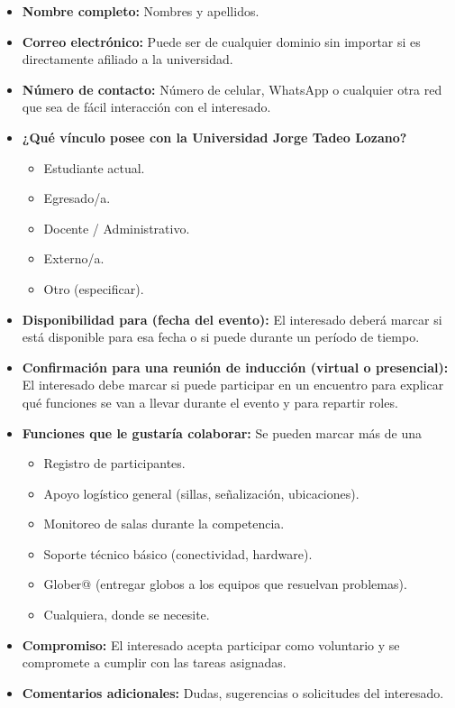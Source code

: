 \documentclass{article}
\begin{document}
\begin{itemize}
  \item \textbf{Nombre completo:} Nombres y apellidos.
  \item \textbf{Correo electrónico:} Puede ser de cualquier dominio sin importar si es directamente afiliado a la universidad.
  \item \textbf{Número de contacto:} Número de celular, WhatsApp o cualquier otra red que sea de fácil interacción con el interesado.
  \item \textbf{¿Qué vínculo posee con la Universidad Jorge Tadeo Lozano?}
        \begin{itemize}[label=$\square$]
          \item  Estudiante actual.
          \item  Egresado/a.
          \item  Docente / Administrativo.
          \item  Externo/a.
          \item  Otro (especificar).
        \end{itemize}
  \item \textbf{Disponibilidad para (fecha del evento):} El interesado deberá marcar si está disponible para esa fecha o si puede durante un período de tiempo.
  \item \textbf{Confirmación para una reunión de inducción (virtual o presencial):} El interesado debe marcar si puede participar en un encuentro para explicar qué funciones se van a llevar durante el evento y para repartir roles.
  \item \textbf{Funciones que le gustaría colaborar:} Se pueden marcar más de una
        \begin{itemize}[label=$\square$]
          \item Registro de participantes.
          \item Apoyo logístico general (sillas, señalización, ubicaciones).
          \item Monitoreo de salas durante la competencia.
          \item Soporte técnico básico (conectividad, hardware).
          \item Glober@ (entregar globos a los equipos que resuelvan problemas).
          \item Cualquiera, donde se necesite.
        \end{itemize}
  \item \textbf{Compromiso:} El interesado acepta participar como voluntario y se compromete a cumplir con las tareas asignadas.
  \item \textbf{Comentarios adicionales:} Dudas, sugerencias o solicitudes del interesado.
\end{itemize}
\end{document}

